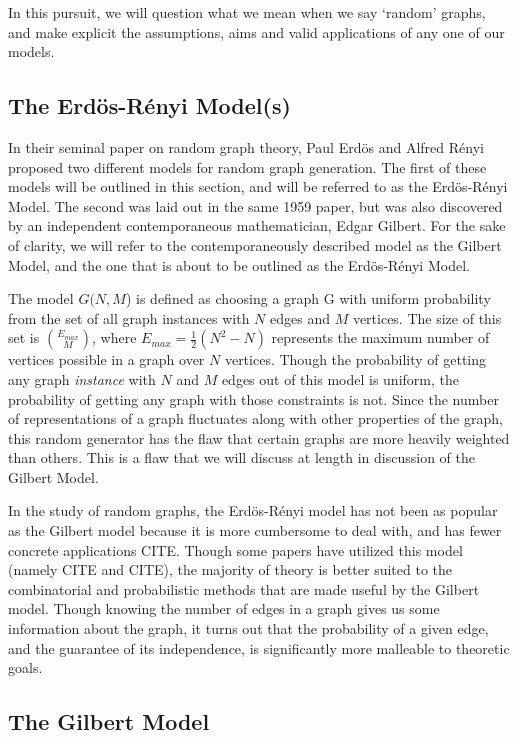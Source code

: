 In this pursuit, we will question what we mean when we say `random' graphs, and make explicit the assumptions, aims and valid applications of any one of our models. 

\subsection{The Erd\"os-R\'enyi Model(s)}

In their seminal paper on random graph theory, Paul Erd\"os and Alfred R\'enyi proposed two different models for random graph generation.
The first of these models will be outlined in this section, and will be referred to as the Erd\"os-R\'enyi Model.
The second was laid out in the same 1959 paper, but was also discovered by an independent contemporaneous mathematician, Edgar Gilbert.
For the sake of clarity, we will refer to the contemporaneously described model as the Gilbert Model, and the one that is about to be outlined as the Erd\"os-R\'enyi Model.

The model $G(N, M$) is defined as choosing a graph G with uniform probability from the set of all graph instances with $N$ edges and $M$ vertices.
The size of this set is $\binom{E_{max}}{M}$, where $E_{max} = \frac{1}{2}(N^2 - N)$ represents the maximum number of vertices possible in a graph over $N$ vertices.
Though the probability of getting any graph \emph{instance} with $N$ and $M$ edges out of this model is uniform, the probability of getting any graph with those constraints is not.
Since the number of representations of a graph fluctuates along with other properties of the graph, this random generator has the flaw that certain graphs are more heavily weighted than others.
This is a flaw that we will discuss at length in discussion of the Gilbert Model.

In the study of random graphs, the Erd\"os-R\'enyi model has not been as popular as the Gilbert model because it is more cumbersome to deal with, and has fewer concrete applications CITE.
Though some papers have utilized this model (namely CITE and CITE), the majority of theory is better suited to the combinatorial and probabilistic methods that are made useful by the Gilbert model.
Though knowing the number of edges in a graph gives us some information about the graph, it turns out that the probability of a given edge, and the guarantee of its independence, is significantly more malleable to theoretic goals.

\subsection{The Gilbert Model}

